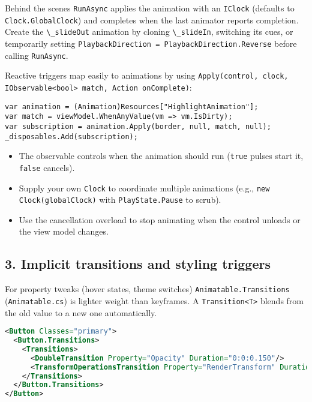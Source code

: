 Behind the scenes \passthrough{\lstinline!RunAsync!} applies the
animation with an \passthrough{\lstinline!IClock!} (defaults to
\passthrough{\lstinline!Clock.GlobalClock!}) and completes when the last
animator reports completion. Create the
\passthrough{\lstinline!\_slideOut!} animation by cloning
\passthrough{\lstinline!\_slideIn!}, switching its cues, or temporarily
setting
\passthrough{\lstinline!PlaybackDirection = PlaybackDirection.Reverse!}
before calling \passthrough{\lstinline!RunAsync!}.

Reactive triggers map easily to animations by using
\passthrough{\lstinline!Apply(control, clock, IObservable<bool> match, Action onComplete)!}:

\begin{lstlisting}
var animation = (Animation)Resources["HighlightAnimation"];
var match = viewModel.WhenAnyValue(vm => vm.IsDirty);
var subscription = animation.Apply(border, null, match, null);
_disposables.Add(subscription);
\end{lstlisting}

\begin{itemize}
\tightlist
\item
  The observable controls when the animation should run
  (\passthrough{\lstinline!true!} pulses start it,
  \passthrough{\lstinline!false!} cancels).
\item
  Supply your own \passthrough{\lstinline!Clock!} to coordinate multiple
  animations (e.g., \passthrough{\lstinline!new Clock(globalClock)!}
  with \passthrough{\lstinline!PlayState.Pause!} to scrub).
\item
  Use the cancellation overload to stop animating when the control
  unloads or the view model changes.
\end{itemize}

\subsection{3. Implicit transitions and styling
triggers}\label{implicit-transitions-and-styling-triggers}

For property tweaks (hover states, theme switches)
\passthrough{\lstinline!Animatable.Transitions!}
(\passthrough{\lstinline!Animatable.cs!}) is lighter weight than
keyframes. A \passthrough{\lstinline!Transition<T>!} blends from the old
value to a new one automatically.

\begin{lstlisting}[language=XML]
<Button Classes="primary">
  <Button.Transitions>
    <Transitions>
      <DoubleTransition Property="Opacity" Duration="0:0:0.150"/>
      <TransformOperationsTransition Property="RenderTransform" Duration="0:0:0.200"/>
    </Transitions>
  </Button.Transitions>
</Button>
\end{lstlisting}


